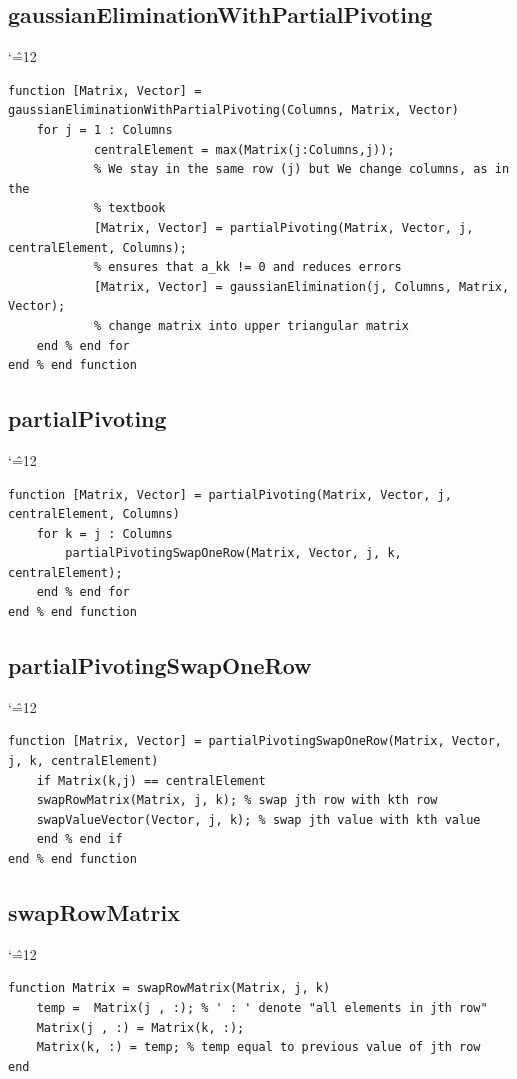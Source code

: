\documentclass[12pt]{report}
\newenvironment{simplechar}{%
   \catcode`\^=12
}{}
\begin{document}
\newpage
\subsection{gaussianEliminationWithPartialPivoting}
\begin{simplechar}
\begin{lstlisting}
function [Matrix, Vector] = gaussianEliminationWithPartialPivoting(Columns, Matrix, Vector)
    for j = 1 : Columns
            centralElement = max(Matrix(j:Columns,j));
            % We stay in the same row (j) but We change columns, as in the
            % textbook
            [Matrix, Vector] = partialPivoting(Matrix, Vector, j, centralElement, Columns);
            % ensures that a_kk != 0 and reduces errors
            [Matrix, Vector] = gaussianElimination(j, Columns, Matrix, Vector);
            % change matrix into upper triangular matrix
    end % end for
end % end function
\end{lstlisting}
\end{simplechar}

\subsection{partialPivoting}
\begin{simplechar}
\begin{lstlisting}
function [Matrix, Vector] = partialPivoting(Matrix, Vector, j, centralElement, Columns)
    for k = j : Columns
        partialPivotingSwapOneRow(Matrix, Vector, j, k, centralElement);
    end % end for
end % end function
\end{lstlisting}
\end{simplechar}

\subsection{partialPivotingSwapOneRow}
\begin{simplechar}
\begin{lstlisting}
function [Matrix, Vector] = partialPivotingSwapOneRow(Matrix, Vector, j, k, centralElement)
    if Matrix(k,j) == centralElement
    swapRowMatrix(Matrix, j, k); % swap jth row with kth row
    swapValueVector(Vector, j, k); % swap jth value with kth value
    end % end if
end % end function
\end{lstlisting}
\end{simplechar}


\subsection{swapRowMatrix}
\begin{simplechar}
\begin{lstlisting}
function Matrix = swapRowMatrix(Matrix, j, k)
    temp =  Matrix(j , :); % ' : ' denote "all elements in jth row"
    Matrix(j , :) = Matrix(k, :);
    Matrix(k, :) = temp; % temp equal to previous value of jth row
end
\end{lstlisting}
\end{simplechar}
\end{document}
